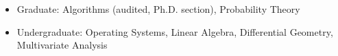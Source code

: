 \documentclass{cv}
\begin{document}
\begin{minipage}{\textwidth}
  \begin{itemize}[noitemsep,topsep=0pt]%
    \item Graduate: Algorithms (audited, Ph.D. section), Probability Theory
    \item Undergraduate: Operating Systems, Linear Algebra, Differential Geometry, Multivariate Analysis
  \end{itemize}%
\end{minipage}%
\end{document}
